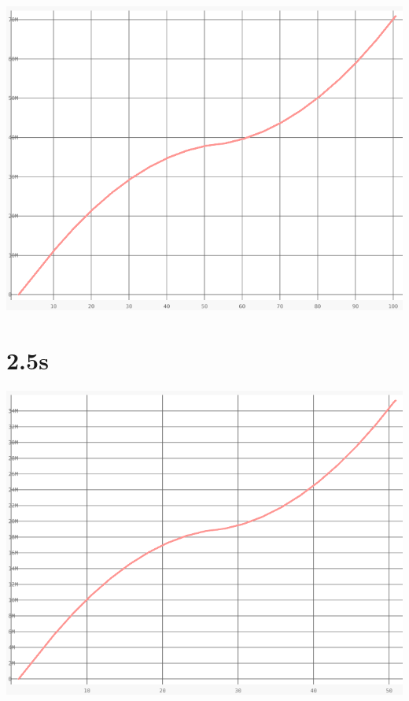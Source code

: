 \documentclass{article}
\begin{document}
    \begin{center}
    \includegraphics[angle=90]{set_a_5s/set_a_5s.png}
    \end{center}
\clearpage

\section{2.5s}
    \noindent\begin{minipage}{.45\textwidth}
    
    \end{minipage}\hfill
    \begin{minipage}{.45\textwidth}
    
    \end{minipage}
    
    \begin{center}
    \includegraphics[angle=90]{set_a_2.5s/set_a_2_5s.png}
    \end{center}
\clearpage
\end{document}
